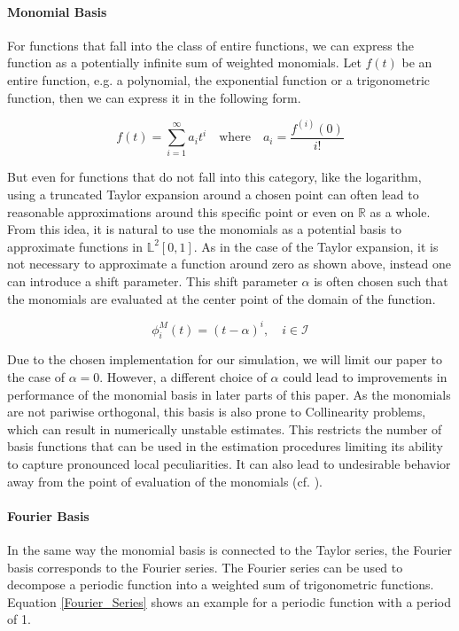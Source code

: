 \documentclass[11pt,twoside,a4paper]{article}
\begin{document}
	\paragraph{Monomial Basis}
	For functions that fall into the class of entire functions, we can express the function as a potentially infinite sum of weighted monomials. Let $f(t)$ be an entire function, e.g. a polynomial, the exponential function or a trigonometric function, then we can express it in the following form.
	
	\begin{equation}\label{Taylor_expansion}
		f(t) = \sum_{i = 1}^{\infty}a_i t^i \quad \text{where} \quad a_i = \frac{f^{(i)}(0)}{i!}
	\end{equation}
	
	But even for functions that do not fall into this category, like the logarithm, using a truncated Taylor expansion around a chosen point can often lead to reasonable approximations around this specific point or even on $\mathbb{R}$ as a whole. From this idea, it is natural to use the monomials as a potential basis to approximate functions in $\mathbb{L}^2[0,1]$. As in the case of the Taylor expansion, it is not necessary to approximate a function around zero as shown above, instead one can introduce a shift parameter. This shift parameter $\alpha$ is often chosen such that the monomials are evaluated at the center point of the domain of the function.
	
	\begin{equation}
		\phi_{i}^{M}(t) = (t-\alpha)^i, \quad i \in \mathcal{I}
	\end{equation}

	Due to the chosen implementation for our simulation, we will limit our paper to the case of $\alpha = 0$. However, a different choice of $\alpha$ could lead to improvements in performance of the monomial basis in later parts of this paper.
	As the monomials are not pariwise orthogonal, this basis is also prone to Collinearity problems, which can result in numerically unstable estimates. This restricts the number of basis functions that can be used in the estimation procedures limiting its ability to capture pronounced local peculiarities. It can also lead to undesirable behavior away from the point of evaluation of the monomials (cf. \cite{ramsay_functional_2005}).
	
	\paragraph{Fourier Basis}
	In the same way the monomial basis is connected to the Taylor series, the Fourier basis corresponds to the Fourier series. The Fourier series can be used to decompose a periodic function into a weighted sum of trigonometric functions. Equation \ref{Fourier_Series} shows an example for a periodic function with a period of 1.
	
\end{document}
